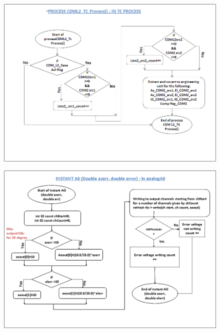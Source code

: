 \begin{figure}[H]
	\centering
	\includegraphics[width=\linewidth]{./FlowCharts/PngFlowCharts/TCP9.png}
\end{figure}

\begin{figure}[H]
	\centering
	\includegraphics[width=\linewidth]{./FlowCharts/PngFlowCharts/TCP10.png}
\end{figure}

